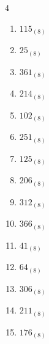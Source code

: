 \begin{multicols}{4}
\begin{enumerate}
        \phantom{$=240$}

  \item $115_{(8)}$

        \phantom{$=77$}

  \item $25_{(8)}$

        \phantom{$=21$}

  \item $361_{(8)}$

        \phantom{$=241$}

  \item $214_{(8)}$

        \phantom{$=140$}

  \item $102_{(8)}$

        \phantom{$=66$}

\columnbreak %

  \item $251_{(8)}$

        \phantom{$=169$}

  \item $125_{(8)}$

        \phantom{$=85$}

  \item $206_{(8)}$

        \phantom{$=134$}

  \item $312_{(8)}$

        \phantom{$=202$}

  \item $366_{(8)}$

        \phantom{$=246$}

  \item $41_{(8)}$

        \phantom{$=33$}

  \item $64_{(8)}$

        \phantom{$=52$}

  \item $306_{(8)}$

        \phantom{$=198$}

  \item $211_{(8)}$

        \phantom{$=137$}

  \item $176_{(8)}$

        \phantom{$=126$}


\end{enumerate}
\end{multicols}
